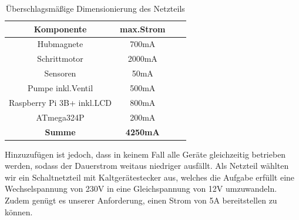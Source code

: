 \begin{table}[h]
    \centering
    \begin{tabular}{|c|c|c|c|}
        \hline
        \textbf{Komponente} & \textbf{max.Strom} \\ \hline
        Hubmagnete & 700mA \\ \hline
        Schrittmotor & 2000mA \\ \hline
        Sensoren & 50mA \\ \hline
        Pumpe inkl.Ventil & 500mA \\ \hline
        Raspberry Pi 3B+ inkl.\acs{LCD} & 800mA \\ \hline
        ATmega324P & 200mA \\ \hline
        \textbf{Summe} & \textbf{4250mA} \\ \hline
    \end{tabular}
    \caption{Überschlagsmäßige Dimensionierung des Netzteils}
\end{table}

Hinzuzufügen ist jedoch, dass in keinem Fall alle Geräte gleichzeitig betrieben werden, sodass der Dauerstrom weitaus niedriger ausfällt.
Als Netzteil wählten wir ein Schaltnetzteil mit Kaltgerätestecker aus, welches die Aufgabe erfüllt eine Wechselspannung von 230V in eine Gleichspannung von 12V umzuwandeln.
Zudem genügt es unserer Anforderung, einen Strom von 5A bereitstellen zu können.

